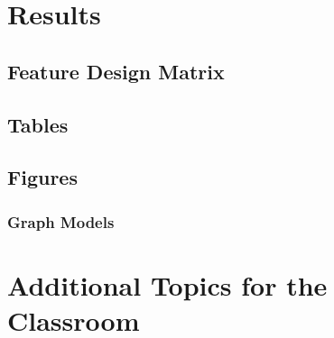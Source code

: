 \section{Results}

\subsection{Feature Design Matrix}

\subsection{Tables}

\subsection{Figures}

\subsubsection{Graph Models}

\section{Additional Topics for the Classroom}

\begin{enumerate}
\end{enumerate}



\begin{thebibliography}{00}

\end{thebibliography}


